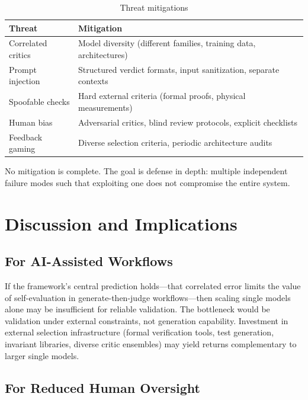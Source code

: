 \documentclass[11pt]{article}
\begin{document}
\begin{table}[h]
\centering
\caption{Threat mitigations}
\begin{tabular}{ll}
\toprule
\textbf{Threat} & \textbf{Mitigation} \\
\midrule
Correlated critics & Model diversity (different families, training data, architectures) \\
Prompt injection & Structured verdict formats, input sanitization, separate contexts \\
Spoofable checks & Hard external criteria (formal proofs, physical measurements) \\
Human bias & Adversarial critics, blind review protocols, explicit checklists \\
Feedback gaming & Diverse selection criteria, periodic architecture audits \\
\bottomrule
\end{tabular}
\end{table}

No mitigation is complete. The goal is defense in depth: multiple independent failure modes such that exploiting one does not compromise the entire system.

\section{Discussion and Implications}

\subsection{For AI-Assisted Workflows}

If the framework's central prediction holds---that correlated error limits the value of self-evaluation in generate-then-judge workflows---then scaling single models alone may be insufficient for reliable validation. The bottleneck would be validation under external constraints, not generation capability. Investment in external selection infrastructure (formal verification tools, test generation, invariant libraries, diverse critic ensembles) may yield returns complementary to larger single models.

\subsection{For Reduced Human Oversight}
\end{document}
